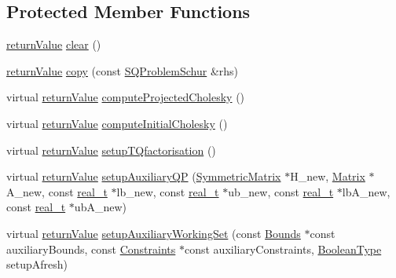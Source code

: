 \subsection*{Protected Member Functions}
\begin{DoxyCompactItemize}
\item 
\hyperlink{_message_handling_8hpp_a81d556f613bfbabd0b1f9488c0fa865e}{return\+Value} \hyperlink{class_s_q_problem_schur_a29108375fc3c667c9fdd6c7b6405198f}{clear} ()
\item 
\hyperlink{_message_handling_8hpp_a81d556f613bfbabd0b1f9488c0fa865e}{return\+Value} \hyperlink{class_s_q_problem_schur_a36259e97b43141dd9400cdfc22a0eca6}{copy} (const \hyperlink{class_s_q_problem_schur}{S\+Q\+Problem\+Schur} \&rhs)
\item 
virtual \hyperlink{_message_handling_8hpp_a81d556f613bfbabd0b1f9488c0fa865e}{return\+Value} \hyperlink{class_s_q_problem_schur_aa98408881b63d7bd758df680603a1bb9}{compute\+Projected\+Cholesky} ()
\item 
virtual \hyperlink{_message_handling_8hpp_a81d556f613bfbabd0b1f9488c0fa865e}{return\+Value} \hyperlink{class_s_q_problem_schur_aa14dbff1ae7aed776437a4b34f6cc062}{compute\+Initial\+Cholesky} ()
\item 
virtual \hyperlink{_message_handling_8hpp_a81d556f613bfbabd0b1f9488c0fa865e}{return\+Value} \hyperlink{class_s_q_problem_schur_a51aa150223f6fd36b22db84090b97cbf}{setup\+T\+Qfactorisation} ()
\item 
virtual \hyperlink{_message_handling_8hpp_a81d556f613bfbabd0b1f9488c0fa865e}{return\+Value} \hyperlink{class_s_q_problem_schur_ad73504bed5ff64956f18666bca9f54b2}{setup\+Auxiliary\+QP} (\hyperlink{class_symmetric_matrix}{Symmetric\+Matrix} $\ast$H\+\_\+new, \hyperlink{class_matrix}{Matrix} $\ast$A\+\_\+new, const \hyperlink{qp_o_a_s_e_s__wrapper_8h_a0d00e2b3dfadee81331bbb39068570c4}{real\+\_\+t} $\ast$lb\+\_\+new, const \hyperlink{qp_o_a_s_e_s__wrapper_8h_a0d00e2b3dfadee81331bbb39068570c4}{real\+\_\+t} $\ast$ub\+\_\+new, const \hyperlink{qp_o_a_s_e_s__wrapper_8h_a0d00e2b3dfadee81331bbb39068570c4}{real\+\_\+t} $\ast$lb\+A\+\_\+new, const \hyperlink{qp_o_a_s_e_s__wrapper_8h_a0d00e2b3dfadee81331bbb39068570c4}{real\+\_\+t} $\ast$ub\+A\+\_\+new)
\item 
virtual \hyperlink{_message_handling_8hpp_a81d556f613bfbabd0b1f9488c0fa865e}{return\+Value} \hyperlink{class_s_q_problem_schur_ade016d6f90fd2761ca573d3efd9b575e}{setup\+Auxiliary\+Working\+Set} (const \hyperlink{class_bounds}{Bounds} $\ast$const auxiliary\+Bounds, const \hyperlink{class_constraints}{Constraints} $\ast$const auxiliary\+Constraints, \hyperlink{_types_8hpp_a20f82124c82b6f5686a7fce454ef9089}{Boolean\+Type} setup\+Afresh)

\end{DoxyCompactItemize}
